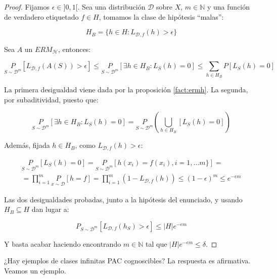   \begin{proof}
  Fijamos $\epsilon \in ]0,1[$. Sea una distribución $\mathcal{D}$ sobre $X$, $m\in \mathbb{N}$ y una función de verdadero 
  etiquetado $f\in H$, tomamos la clase de hipótesis ``malas'':

  \[H_B = \{h\in H: L_{\mathcal{D},f}(h) > \epsilon\}\]

  Sea $A$ un $ERM_{\mathcal{H}}$, entonces:

  \[\underset{S\sim \mathcal{D}^m}{P} [L_{\mathcal{D},f}(A(S)) > \epsilon] \le \underset{S\sim \mathcal{D}^m}{P} 
  [\exists h\in H_B : L_S(h) = 0] \le \sum_{h\in H_B} P [L_S(h) = 0] \]

  La primera desigualdad viene dada por la proposición \ref{fact:ermh}. La segunda, por subaditividad, puesto que:
  
  \[\underset{S\sim \mathcal{D}^m}{P} [\exists h\in H_B : L_S(h) = 0] = \underset{S\sim \mathcal{D}^m}{P} \left(\underset{h\in H_B}{\bigcup} [L_S(h) = 0]\right)\]

  Además, fijada $h\in H_B$, como $L_{\mathcal{D},f}(h) > \epsilon$:

  \begin{align*}
  \underset{S\sim \mathcal{D}^m}{P}[L_S(h) = 0] = \underset{S\sim \mathcal{D}^m}{P}[h(x_i) = f(x_i), i =1,\ldots m\}] =\\
  = \prod_{i=1}^m \underset{x\sim \mathcal{D}}{P}[h = f] = \prod_{i=1}^m (1 - L_{\mathcal{D},f}(h)) \le (1-\epsilon)^m \le e^{-\epsilon m}
  \end{align*}


  Las dos desigualdades probadas, junto a la hipótesis del enunciado, y usando $H_B \subseteq H$ dan lugar a:

  \[P_{S\sim \mathcal{D}^m}[L_{\mathcal{D},f}(h_S) > \epsilon] \le |H|e^{-\epsilon m}\]
  
  Y basta acabar haciendo encontrando $m\in \mathbb{N}$ tal que $|H|e^{-\epsilon m} \le \delta$.
  \end{proof}

¿Hay ejemplos de clases infinitas PAC cognoscibles? La respuesta es afirmativa. Veamos un ejemplo.

